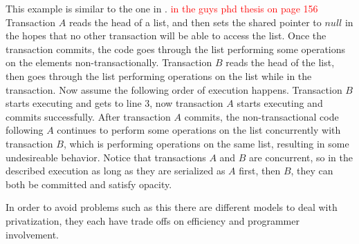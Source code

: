 This example is similar to the one in \cite{}. \textcolor{Red}{in the guys phd thesis on page 156}
Transaction $A$ reads the head of a list, and then sets the shared pointer to $null$ in the hopes that no other transaction will be able to access the list.
Once the transaction commits, the code goes through the list performing some operations on the elements non-transactionally.
Transaction $B$ reads the head of the list, then goes through the list performing operations on the list while in the transaction.
Now assume the following order of execution happens.
Transaction $B$ starts executing and gets to line $3$, now transaction $A$ starts executing and commits successfully.
After transaction $A$ commits, the non-transactional code following $A$ continues to perform some operations on the list concurrently with transaction $B$, which is performing operations on the same list, resulting in some undesireable behavior.
Notice that transactions $A$ and $B$ are concurrent, so in the described execution as long as they are serialized as $A$ first, then $B$, they can both be committed and satisfy opacity.

In order to avoid problems such as this there are different models to deal with privatization, they each have trade offs on efficiency and programmer involvement.

